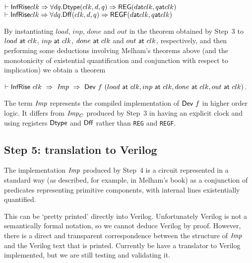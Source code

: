 {\baselineskip14pt\begin{alltt}
\( \vdash \DEF{InfRise} clk \Rightarrow {\forall}d q. \DEF{Dtype}(clk,d,q) \Rightarrow \DEF{REG}(d \DEF{at} clk, q \DEF{at} clk) \)
\( \vdash \DEF{InfRise} clk \Rightarrow {\forall}d q. \DEF{Dff}(clk,d,q) \Rightarrow \DEF{REGF}(d \DEF{at} clk, q \DEF{at} clk)  \)
\end{alltt}}



By instantiating $load$, $inp$, $done$ and $out$ in the theorem
obtained by Step~3 to $load~\mathsf{at}~clk$, $inp~\mathsf{at}~clk$,
$done~\mathsf{at}~clk$ and $out~\mathsf{at}~clk$, respectively, and then
performing some deductions involving Melham's theorems above (and the
monotonicity of existential quantification and conjunction with
respect to implication) we obtain a theorem

\vspace*{2mm}

$\vdash \mathsf{InfRise}~clk~\Rightarrow~{\it{Imp}}~\Rightarrow~\mathsf{Dev}~f~(load~\mathsf{at}~clk,inp~\mathsf{at}~clk,done~\mathsf{at}~clk,out~\mathsf{at}~clk)$.

\vspace*{2mm}

The term ${\it{Imp}}$ represents the compiled implementation of $\mathsf{Dev}~f$ in higher order logic.
It differs from ${\it{Imp}}_C$ produced by Step~3 in having an explicit clock and using
registers $\mathsf{Dtype}$ and $\mathsf{Dff}$ rather than \texttt{REG} and \texttt{REGF}.

\subsection*{Step 5: translation to Verilog}

The implementation ${\it{Imp}}$ produced by Step~4 is a circuit
represented in a standard way (as described, for example, in Melham's book)
as a conjunction of predicates representing primitive components,
with internal lines existentially quantified.

This can be `pretty printed' directly into Verilog. Unfortunately
Verilog is not a semantically formal notation, so we cannot deduce
Verilog by proof. However, there is a direct and transparent
correspondence between the structure of ${\it{Imp}}$ and the Verilog
text that is printed.  Currently be have a translator to Verilog
implemented, but we are still testing and validating it.


